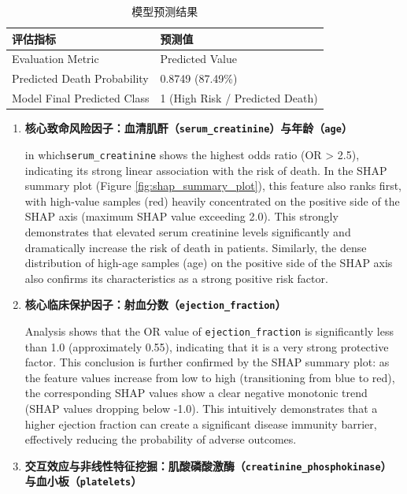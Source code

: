 \documentclass[11pt,a4paper]{article}
\begin{document}
\begin{table}[htbp]
\centering
\caption{模型预测结果}
\label{tab:prediction_result}
\begin{tabular}{ll}
\toprule
\textbf{评估指标} & \textbf{预测值} \\
\midrule
Evaluation Metric & Predicted Value \\
Predicted Death Probability & 0.8749 (87.49\%) \\
Model Final Predicted Class & 1 (High Risk / Predicted Death) \\
\bottomrule
\end{tabular}
\end{table}


\begin{enumerate}
   \item \textbf{核心致命风险因子：血清肌酐（\texttt{serum\_creatinine}）与年龄（\texttt{age}）}
    
    in which\texttt{serum\_creatinine} shows the highest odds ratio (OR > 2.5), indicating its strong linear association with the risk of death. In the SHAP summary plot (Figure \ref{fig:shap_summary_plot}), this feature also ranks first, with high-value samples (red) heavily concentrated on the positive side of the SHAP axis (maximum SHAP value exceeding 2.0). This strongly demonstrates that elevated serum creatinine levels significantly and dramatically increase the risk of death in patients. Similarly, the dense distribution of high-age samples (age) on the positive side of the SHAP axis also confirms its characteristics as a strong positive risk factor.

    \item \textbf{核心临床保护因子：射血分数（\texttt{ejection\_fraction}）}
    
    Analysis shows that the OR value of \texttt{ejection\_fraction} is significantly less than 1.0 (approximately 0.55), indicating that it is a very strong protective factor. This conclusion is further confirmed by the SHAP summary plot: as the feature values increase from low to high (transitioning from blue to red), the corresponding SHAP values show a clear negative monotonic trend (SHAP values dropping below -1.0). This intuitively demonstrates that a higher ejection fraction can create a significant disease immunity barrier, effectively reducing the probability of adverse outcomes.

    \item \textbf{交互效应与非线性特征挖掘：肌酸磷酸激酶（\texttt{creatinine\_phosphokinase}）\\
    与血小板（\texttt{platelets}）}
    

\end{enumerate}
\end{document}
